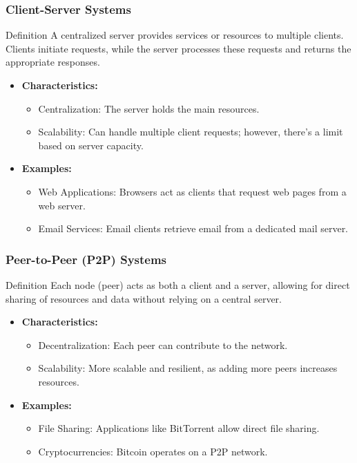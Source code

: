 \documentclass[aspectratio=169]{beamer}
\begin{document}
\begin{frame}[fragile]
    \frametitle{Client-Server Systems}
    \begin{block}{Definition}
        A centralized server provides services or resources to multiple clients. Clients initiate requests, while the server processes these requests and returns the appropriate responses.
    \end{block}

    \begin{itemize}
        \item \textbf{Characteristics:}
        \begin{itemize}
            \item Centralization: The server holds the main resources.
            \item Scalability: Can handle multiple client requests; however, there's a limit based on server capacity.
        \end{itemize}
    
        \item \textbf{Examples:}
        \begin{itemize}
            \item Web Applications: Browsers act as clients that request web pages from a web server.
            \item Email Services: Email clients retrieve email from a dedicated mail server.
        \end{itemize}
    \end{itemize}
\end{frame}

\begin{frame}[fragile]
    \frametitle{Peer-to-Peer (P2P) Systems}
    \begin{block}{Definition}
        Each node (peer) acts as both a client and a server, allowing for direct sharing of resources and data without relying on a central server.
    \end{block}

    \begin{itemize}
        \item \textbf{Characteristics:}
        \begin{itemize}
            \item Decentralization: Each peer can contribute to the network.
            \item Scalability: More scalable and resilient, as adding more peers increases resources.
        \end{itemize}
    
        \item \textbf{Examples:}
        \begin{itemize}
            \item File Sharing: Applications like BitTorrent allow direct file sharing.
            \item Cryptocurrencies: Bitcoin operates on a P2P network.
        \end{itemize}
    \end{itemize}
\end{frame}
\end{document}
